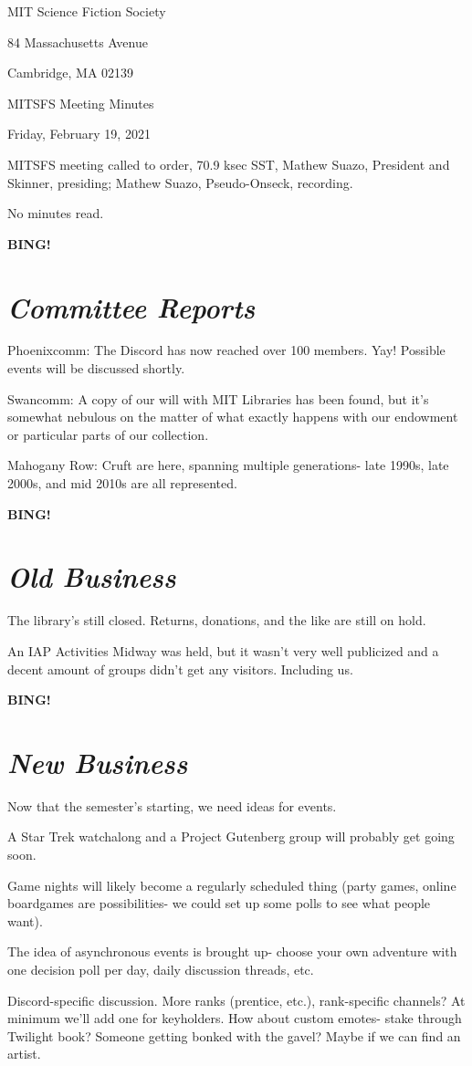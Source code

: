 \documentclass[10pt]{article}
\newcommand{\bing}{{\bf BING!} }
\newcommand{\goto}[1]{\bing \vskip 12pt \section*{{\em{#1}}}}
\newcommand{\skinner}{Mathew Suazo, President and Skinner\xspace}
\newcommand{\onseck}{Mathew Suazo, Pseudo-Onseck\xspace}
\newcommand{\meetingdate}{Friday, February 19, 2021}
\begin{document}
\begin{center}

MIT Science Fiction Society

84 Massachusetts Avenue

Cambridge, MA 02139

\vspace{12pt}

MITSFS Meeting Minutes

\meetingdate

\end{center}

\vspace{18pt}

\setlength{\parskip}{6pt}

\noindent
MITSFS meeting called to order, 70.9 ksec SST,
\skinner, presiding; \onseck, recording.

No minutes read.

\goto{Committee Reports}

Phoenixcomm: The Discord has now reached over 100 members. Yay! Possible events will be discussed shortly.

Swancomm: A copy of our will with MIT Libraries has been found, but it's somewhat nebulous on the matter of what exactly happens with our endowment or particular parts of our collection.

Mahogany Row: Cruft are here, spanning multiple generations- late 1990s, late 2000s, and mid 2010s are all represented.

\goto{Old Business}

The library's still closed. Returns, donations, and the like are still on hold.

An IAP Activities Midway was held, but it wasn't very well publicized and a decent amount of groups didn't get any visitors. Including us.

\goto{New Business}

Now that the semester's starting, we need ideas for events.

A Star Trek watchalong and a Project Gutenberg group will probably get going soon.

Game nights will likely become a regularly scheduled thing (party games, online boardgames are possibilities- we could set up some polls to see what people want).

The idea of asynchronous events is brought up- choose your own adventure with one decision poll per day, daily discussion threads, etc.

Discord-specific discussion. More ranks (prentice, etc.), rank-specific channels? At minimum we'll add one for keyholders. How about custom emotes- stake through Twilight book? Someone getting bonked with the gavel? Maybe if we can find an artist.
\end{document}
